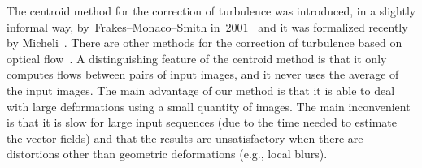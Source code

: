 \documentclass{ipol}
\def\x{\mathbf{x}}
\def\u{\mathbf{u}}
\begin{document}

The centroid method for the correction of turbulence was introduced, in a
slightly informal way, by~Frakes--Monaco--Smith
in~$2001$~\cite{frakes2001suppression} and it was formalized recently by
Micheli~\cite{micheli2013}.  There are other methods for the correction of
turbulence based on optical flow~\cite{maogilles2012}.  A distinguishing
feature of the centroid method is that it only computes flows between pairs of
input images, and it never uses the average of the input images.  The main
advantage of our method is that it is able to deal with large deformations
using a small quantity of images.  The main inconvenient is that it is
slow for large input sequences (due to the time needed to estimate
the vector fields)
and that the results are unsatisfactory when there
are distortions other than geometric deformations (e.g., local blurs).

\end{document}
